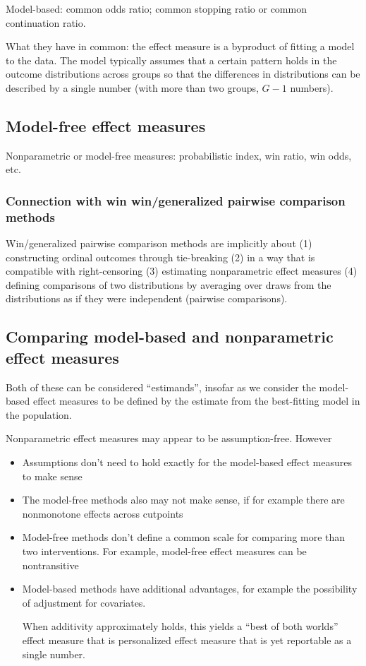 \documentclass[
  11pt,
  fleqn
]{article}
\begin{document}
Model-based: common odds ratio; common stopping ratio or common continuation
ratio.

What they have in common: the effect measure is a byproduct of fitting a model
to the data. The model typically assumes that a certain pattern holds in the
outcome distributions across groups so that the differences in distributions
can be described by a single number (with more than two groups, $G-1$ numbers).

\subsection{Model-free effect measures}

Nonparametric or model-free measures: probabilistic index, win ratio, win odds,
etc.

\subsubsection{Connection with win win/generalized pairwise comparison
methods}

Win/generalized pairwise comparison methods are implicitly about (1)
constructing ordinal outcomes through tie-breaking (2) in a way that is
compatible with right-censoring (3) estimating nonparametric effect
measures (4) defining comparisons of two distributions by averaging
over draws from the distributions as if they were independent
(pairwise comparisons).

\subsection{Comparing model-based and nonparametric effect measures}

Both of these can be considered ``estimands'', insofar as we consider
the model-based effect measures to be defined by the estimate from
the best-fitting model in the population.

Nonparametric effect measures may appear to be assumption-free. However

\begin{itemize}
  \item Assumptions don't need to hold exactly for the model-based
    effect measures to make sense
  \item The model-free methods also may not make sense, if for
    example there are nonmonotone effects across cutpoints
  \item Model-free methods don't define a common scale for comparing
    more than two interventions. For example, model-free effect
    measures can be nontransitive
  \item Model-based methods have additional advantages, for example
    the possibility of adjustment for covariates.

    When additivity approximately holds, this yields a ``best of both
    worlds'' effect measure that is
    personalized effect measure that is yet reportable as a single
    number.
\end{itemize}
\end{document}
